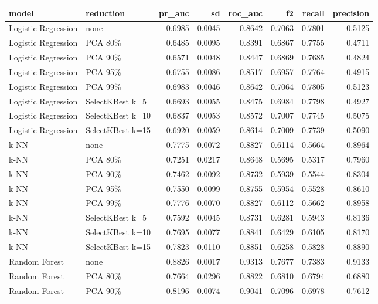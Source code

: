 \begin{table}[H]
\centering
\scriptsize
\begin{adjustbox}{max width=\linewidth}
\begin{tabular}{llrrrrrr}
\toprule
model & reduction & pr\_auc & sd & roc\_auc & f2 & recall & precision \\
\midrule
Logistic Regression & none & 0.6985 & 0.0045 & 0.8642 & 0.7063 & 0.7801 & 0.5125 \\
Logistic Regression & PCA 80\% & 0.6485 & 0.0095 & 0.8391 & 0.6867 & 0.7755 & 0.4711 \\
Logistic Regression & PCA 90\% & 0.6571 & 0.0048 & 0.8447 & 0.6869 & 0.7685 & 0.4824 \\
Logistic Regression & PCA 95\% & 0.6755 & 0.0086 & 0.8517 & 0.6957 & 0.7764 & 0.4915 \\
Logistic Regression & PCA 99\% & 0.6983 & 0.0046 & 0.8642 & 0.7064 & 0.7805 & 0.5123 \\
Logistic Regression & SelectKBest k=5 & 0.6693 & 0.0055 & 0.8475 & 0.6984 & 0.7798 & 0.4927 \\
Logistic Regression & SelectKBest k=10 & 0.6837 & 0.0053 & 0.8572 & 0.7007 & 0.7745 & 0.5075 \\
Logistic Regression & SelectKBest k=15 & 0.6920 & 0.0059 & 0.8614 & 0.7009 & 0.7739 & 0.5090 \\
k-NN & none & 0.7775 & 0.0072 & 0.8827 & 0.6114 & 0.5664 & 0.8964 \\
k-NN & PCA 80\% & 0.7251 & 0.0217 & 0.8648 & 0.5695 & 0.5317 & 0.7960 \\
k-NN & PCA 90\% & 0.7462 & 0.0092 & 0.8732 & 0.5939 & 0.5544 & 0.8304 \\
k-NN & PCA 95\% & 0.7550 & 0.0099 & 0.8755 & 0.5954 & 0.5528 & 0.8610 \\
k-NN & PCA 99\% & 0.7776 & 0.0070 & 0.8827 & 0.6112 & 0.5662 & 0.8958 \\
k-NN & SelectKBest k=5 & 0.7592 & 0.0045 & 0.8731 & 0.6281 & 0.5943 & 0.8136 \\
k-NN & SelectKBest k=10 & 0.7695 & 0.0077 & 0.8841 & 0.6429 & 0.6105 & 0.8170 \\
k-NN & SelectKBest k=15 & 0.7823 & 0.0110 & 0.8851 & 0.6258 & 0.5828 & 0.8890 \\
Random Forest & none & 0.8826 & 0.0017 & 0.9313 & 0.7677 & 0.7383 & 0.9133 \\
Random Forest & PCA 80\% & 0.7664 & 0.0296 & 0.8822 & 0.6810 & 0.6794 & 0.6880 \\
Random Forest & PCA 90\% & 0.8196 & 0.0074 & 0.9041 & 0.7096 & 0.6978 & 0.7612 \\

\end{tabular}
\end{adjustbox}
\end{table}
